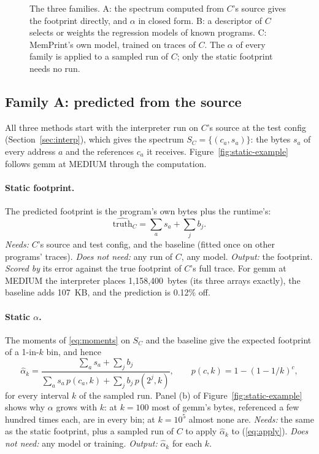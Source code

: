 \documentclass[11pt]{article}
\newcommand{\memprint}{MemPrint}
\newcommand{\secref}[1]{Section~\ref{#1}}
\newcommand{\figref}[1]{Figure~\ref{#1}}
\begin{document}
\begin{figure}[!htbp]
{}
\caption[The three families of methods]{The three families. A: the spectrum computed from $C$'s source gives the
footprint directly, and $\alpha$ in closed form. B: a descriptor of $C$ selects or weights the regression models of
known programs. C: \memprint{}'s own model, trained on traces of $C$. The $\alpha$ of every family is applied to a
sampled run of $C$; only the static footprint needs no run.}
\label{fig:families}
\end{figure}

\subsection{Family A: predicted from the source}

All three methods start with the interpreter run on $C$'s source at the test config (\secref{sec:interp}), which gives
the spectrum $S_C = \{(c_a, s_a)\}$: the bytes $s_a$ of every address $a$ and the references $c_a$ it receives.
\figref{fig:static-example} follows gemm at MEDIUM through the computation.

\paragraph{Static footprint.} The predicted footprint is the program's own bytes plus the runtime's:
\begin{equation}
\widehat{\text{truth}}_C = \sum_a s_a + \sum_j b_j .
\label{eq:static-fp}
\end{equation}
\emph{Needs:} $C$'s source and test config, and the baseline (fitted once on other programs' traces). \emph{Does not
need:} any run of $C$, any model. \emph{Output:} the footprint. \emph{Scored by} its error against the true footprint
of $C$'s full trace. For gemm at MEDIUM the interpreter places 1{,}158{,}400~bytes (its three arrays exactly), the
baseline adds 107~KB, and the prediction is 0.12\% off.

\paragraph{Static $\alpha$.} The moments of \eqref{eq:moments} on $S_C$ and the baseline give the expected footprint of
a 1-in-$k$ bin, and hence
\begin{equation}
\hat\alpha_k = \frac{\sum_a s_a + \sum_j b_j}{\sum_a s_a\,p(c_a,k) + \sum_j b_j\,p(2^j,k)} , \qquad
p(c,k) = 1-(1-1/k)^c ,
\label{eq:static-alpha}
\end{equation}
for every interval $k$ of the sampled run. Panel (b) of \figref{fig:static-example} shows why $\alpha$ grows with $k$: at
$k=100$ most of gemm's bytes, referenced a few hundred times each, are in every bin; at $k=10^5$ almost none are.
\emph{Needs:} the same as the static footprint, plus a sampled run of $C$ to apply $\hat\alpha_k$ to
(\eqref{eq:apply}). \emph{Does not need:} any model or training. \emph{Output:} $\hat\alpha_k$ for each $k$.
\end{document}
